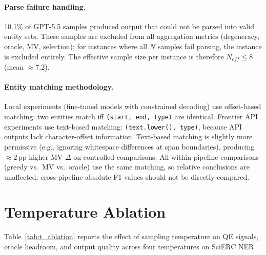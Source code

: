 \paragraph{Parse failure handling.}
10.1\% of GPT-5.5 samples produced output that could not be parsed into valid entity sets.
These samples are excluded from all aggregation metrics (degeneracy, oracle, MV, selection); for instances where all $N$ samples fail parsing, the instance is excluded entirely.
The effective sample size per instance is therefore $N_{\textit{eff}} \leq 8$ (mean ${\approx}7.2$).

\paragraph{Entity matching methodology.}
Local experiments (fine-tuned models with constrained decoding) use offset-based matching: two entities match iff \texttt{(start, end, type)} are identical.
Frontier API experiments use text-based matching: \texttt{(text.lower(), type)}, because API outputs lack character-offset information.
Text-based matching is slightly more permissive (e.g., ignoring whitespace differences at span boundaries), producing ${\approx}2$\,pp higher MV $\Delta$ on controlled comparisons.
All within-pipeline comparisons (greedy vs.\ MV vs.\ oracle) use the same matching, so relative conclusions are unaffected; cross-pipeline absolute F1 values should not be directly compared.

\section{Temperature Ablation}\label{app:t_ablation}

Table~\ref{tab:t_ablation} reports the effect of sampling temperature on QE signals, oracle headroom, and output quality across four temperatures on SciERC NER.

\begin{table}[t]
\centering
\small
\caption{Temperature ablation on SciERC NER (Qwen3-8B, $N{=}8$, seed${=}42$). Oracle gap and QE $\rho$ across four temperatures. $\kappa$: Fleiss' $\kappa$ (inter-sample agreement). $T{=}0.5$ and $T{=}1.0$ use joint (NER+RE) subtask; $T{=}0.8$ and $T{=}1.2$ use NER-only.}
\label{tab:t_ablation}
\end{table}

